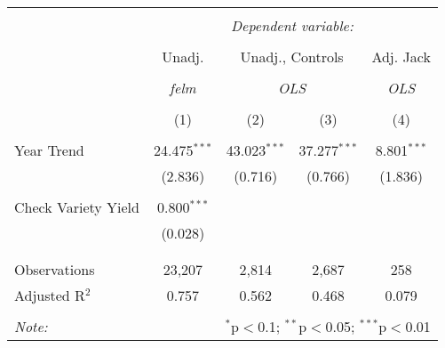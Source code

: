 
\begin{table}[!htbp] \centering 
  \caption{} 
  \label{} 
\begin{tabular}{@{\extracolsep{5pt}}lcccc} 
\\[-1.8ex]\hline 
\hline \\[-1.8ex] 
 & \multicolumn{4}{c}{\textit{Dependent variable:}} \\ 
\cline{2-5} 
\\[-1.8ex] & Unadj. & \multicolumn{2}{c}{Unadj., Controls} & Adj. Jack \\ 
\\[-1.8ex] & \textit{felm} & \multicolumn{2}{c}{\textit{OLS}} & \textit{OLS} \\ 
\\[-1.8ex] & (1) & (2) & (3) & (4)\\ 
\hline \\[-1.8ex] 
 Year Trend & 24.475$^{***}$ & 43.023$^{***}$ & 37.277$^{***}$ & 8.801$^{***}$ \\ 
  & (2.836) & (0.716) & (0.766) & (1.836) \\ 
  & & & & \\ 
 Check Variety Yield & 0.800$^{***}$ &  &  &  \\ 
  & (0.028) &  &  &  \\ 
  & & & & \\ 
\hline \\[-1.8ex] 
Observations & 23,207 & 2,814 & 2,687 & 258 \\ 
Adjusted R$^{2}$ & 0.757 & 0.562 & 0.468 & 0.079 \\ 
\hline 
\hline \\[-1.8ex] 
\textit{Note:}  & \multicolumn{4}{r}{$^{*}$p$<$0.1; $^{**}$p$<$0.05; $^{***}$p$<$0.01} \\ 
\end{tabular} 
\end{table} 
